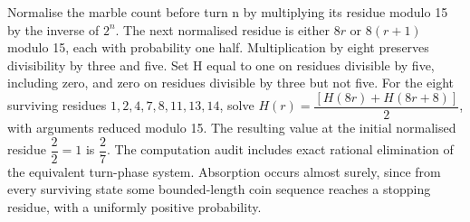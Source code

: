 Normalise the marble count before turn n by multiplying its residue modulo 15 by the inverse of $2^n$. The next normalised residue is either $8r$ or $8(r+1)$ modulo 15, each with probability one half. Multiplication by eight preserves divisibility by three and five. Set H equal to one on residues divisible by five, including zero, and zero on residues divisible by three but not five. For the eight surviving residues $1,2,4,7,8,11,13,14$, solve $H(r)=\dfrac{[H(8r)+H(8r+8)]}{2}$, with arguments reduced modulo 15. The resulting value at the initial normalised residue $\dfrac{2}{2}=1$ is $\boxed{\dfrac{2}{7}}$. The computation audit includes exact rational elimination of the equivalent turn-phase system. Absorption occurs almost surely, since from every surviving state some bounded-length coin sequence reaches a stopping residue, with a uniformly positive probability.
